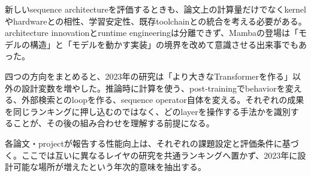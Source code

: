 新しいsequence architectureを評価するときも、論文上の計算量だけでなくkernelやhardwareとの相性、学習安定性、既存toolchainとの統合を考える必要がある。architecture innovationとruntime engineeringは分離できず、Mambaの登場は「モデルの構造」と「モデルを動かす実装」の境界を改めて意識させる出来事でもあった。\autocite{src-5dd64e15cc75}


四つの方向をまとめると、2023年の研究は「より大きなTransformerを作る」以外の設計変数を増やした。推論時に計算を使う、post-trainingでbehaviorを変える、外部検索とのloopを作る、sequence operator自体を変える。それぞれの成果を同じランキングに押し込むのではなく、どのlayerを操作する手法かを識別することが、その後の組み合わせを理解する前提になる。\autocite{src-21aef0026892,src-5dd64e15cc75,src-8a38211129c4,src-e413c7ab8da4}


\begin{claimboundary}
各論文・projectが報告する性能向上は、それぞれの課題設定と評価条件に基づく。ここでは互いに異なるレイヤの研究を共通ランキングへ置かず、2023年に設計可能な場所が増えたという年次的意味を抽出する。\autocite{src-8a38211129c4}
\end{claimboundary}

